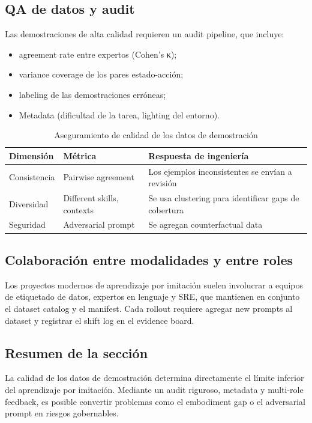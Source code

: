 \documentclass[a4paper]{article}
\begin{document}
\subsection{QA de datos y audit}

Las demostraciones de alta calidad requieren un audit pipeline, que incluye:
\begin{itemize}
    \item agreement rate entre expertos (Cohen's κ);
    \item variance coverage de los pares estado-acción;
    \item labeling de las demostraciones erróneas;
    \item Metadata (dificultad de la tarea, lighting del entorno).
\end{itemize}

\begin{table}[H]
\centering
\begin{tabular}{p{} p{} p{}}
\toprule
Dimensión & Métrica & Respuesta de ingeniería \\
\midrule
Consistencia & Pairwise agreement & Los ejemplos inconsistentes se envían a revisión \\
Diversidad & Different skills, contexts & Se usa clustering para identificar gaps de cobertura \\
Seguridad & Adversarial prompt & Se agregan counterfactual data \\
\bottomrule
\end{tabular}
\caption{Aseguramiento de calidad de los datos de demostración}
\end{table}

\subsection{Colaboración entre modalidades y entre roles}

Los proyectos modernos de aprendizaje por imitación suelen involucrar a equipos de etiquetado de datos, expertos en lenguaje y SRE, que mantienen en conjunto el dataset catalog y el manifest. Cada rollout requiere agregar new prompts al dataset y registrar el shift log en el evidence board.

\subsection{Resumen de la sección}

La calidad de los datos de demostración determina directamente el límite inferior del aprendizaje por imitación. Mediante un audit riguroso, metadata y multi-role feedback, es posible convertir problemas como el embodiment gap o el adversarial prompt en riesgos gobernables.
\end{document}
